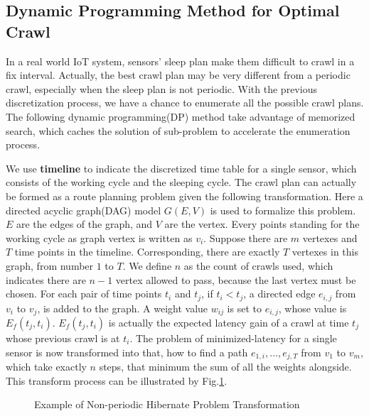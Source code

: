 \documentclass[conference]{IEEEtran}
\begin{document}
\subsection{Dynamic Programming Method for Optimal Crawl}

In a real world IoT system, sensors' sleep plan make them difficult to crawl in a fix interval. 
Actually, the best crawl plan may be very different from a periodic crawl, especially when the sleep plan is not periodic.
With the previous discretization process, we have a chance to enumerate all the possible crawl plans. 
The following dynamic programming(DP) method take advantage of memorized search, which caches the solution of sub-problem to accelerate the enumeration process.

We use \textbf{timeline} to indicate the discretized time table for a single sensor, which consists of the working cycle and the sleeping cycle.
The crawl plan can actually be formed as a route planning problem given the following transformation.
Here a directed acyclic graph(DAG) model $G(E,V)$ is used to formalize this problem.
$E$ are the edges of the graph, and $V$ are the vertex. 
Every points standing for the working cycle as graph vertex is written as $v_i$. 
Suppose there are $m$ vertexes and $T$ time points in the timeline. 
Corresponding, there are exactly $T$ vertexes in this graph, from number $1$ to $T$. 
We define $n$ as the count of crawls used, which indicates there are $n-1$ vertex allowed to pass, because the last vertex must be chosen. 
For each pair of time points $t_i$ and $t_j$, if $t_i<t_j$, a directed edge $e_{i,j}$ from $v_i$ to $v_j$, is added to the graph. 
A weight value $w_{ij}$ is set to $e_{i,j}$, whose value is $E_f(t_j, t_i)$.
$E_f(t_j, t_i)$ is actually the expected latency gain of a crawl at time $t_j$ whose previous crawl is at $t_i$.
The problem of minimized-latency for a single sensor is now transformed into that, how to find a path $e_{1,i},\ldots,e_{j,T}$ from $v_1$ to $v_m$, which take exactly $n$ steps, that minimum the sum of all the weights alongside. 
This transform process can be illustrated by Fig.\ref{fig:problemtrans}.
\begin{figure}
	\centering
	
	\captionsetup{justification=centering}
	\caption{Example of Non-periodic Hibernate Problem Transformation}
	\vspace{-1.5em}
	\label{fig:problemtrans}
\end{figure}
\end{document}
